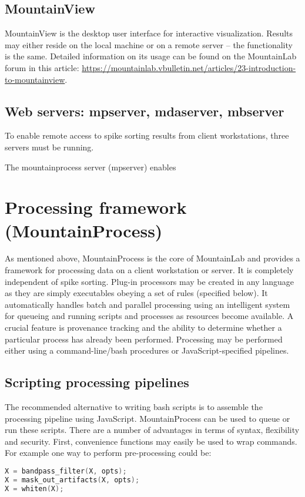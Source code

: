 \documentclass{article}
\begin{document}
\subsection{MountainView}

MountainView is the desktop user interface for interactive visualization. Results may either reside on the local machine or on a remote server -- the functionality is the same. Detailed information on its usage can be found on the MountainLab forum in this article: \url{https://mountainlab.vbulletin.net/articles/23-introduction-to-mountainview}.

\subsection{Web servers: mpserver, mdaserver, mbserver}

To enable remote access to spike sorting results from client workstations, three servers must be running. 

The mountainprocess server (mpserver) enables

\section{Processing framework (MountainProcess)}

As mentioned above, MountainProcess is the core of MountainLab and provides a framework for processing data on a client workstation or server. It is completely independent of spike sorting. Plug-in processors may be created in any language as they are simply executables obeying a set of rules (specified below). It automatically handles batch and parallel processing using an intelligent system for queueing and running scripts and processes as resources become available. A crucial feature is provenance tracking and the ability to determine whether a particular process has already been performed. Processing may be performed either using a command-line/bash procedures or JavaScript-specified pipelines.

\subsection{Scripting processing pipelines}

The recommended alternative to writing bash scripts is to assemble the processing pipeline using JavaScript. MountainProcess can be used to queue or run these scripts. There are a number of advantages in terms of syntax, flexibility and security. First, convenience functions may easily be used to wrap commands. For example one way to perform pre-processing could be:
\begin{lstlisting}[language=C++]
X = bandpass_filter(X, opts);
X = mask_out_artifacts(X, opts);
X = whiten(X);
\end{lstlisting}
\end{document}
